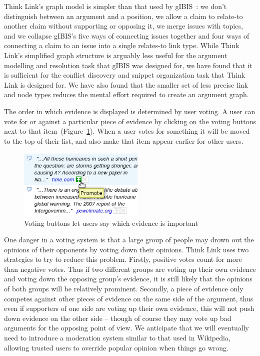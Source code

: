 \documentclass{chi2009}
\newcommand{\todo}[1]{}
\begin{document}
Think Link's graph model is simpler than that used by gIBIS~\cite{Conklin1987a}: we don't distinguish between an argument and a position, we allow a claim to relate-to another claim without supporting or opposing it, we merge issues with topics, and we collapse gIBIS's five ways of connecting issues together and four ways of connecting a claim to an issue into a single relates-to link type. 
While Think Link's simplified graph structure is arguably less useful for the argument modelling and resolution task that gIBIS was designed for, we have found that it is sufficient for the conflict discovery and snippet organization task that Think Link is designed for. 
We have also found that the smaller set of less precise link and node types reduces the mental effort required to create an argument graph.

The order in which evidence is displayed is determined by user voting. A user can vote for or against a particular piece of evidence by clicking on the voting buttons next to that item~(Figure~\ref{voting}). When a user votes for something it will be moved to the top of their list, and also make that item appear earlier for other users.

\begin{figure}[tb]
	\begin{center}
	\includegraphics[width=6cm]{../screenshots/v2_vote.png}
	\caption{Voting buttons let users say which evidence is important}
	\label{voting}
	\end{center}
\end{figure}


One danger in a voting system is that a large group of people may drown out the opinions of their opponents by voting down their opinions. Think Link uses two strategies to try to reduce this problem. Firstly, positive votes count for more than negative votes. Thus if two different groups are voting up their own evidence and voting down the opposing group's evidence, it is still likely that the opinions of both groups will be relatively prominent. Secondly, a piece of evidence only competes against other pieces of evidence on the same side of the argument, thus even if supporters of one side are voting up their own evidence, this will not push down evidence on the other side -- though of course they may vote up bad arguments for the opposing point of view. We anticipate that we will eventually need to introduce a moderation system similar to that used in Wikipedia, allowing trusted users to override popular opinion when things go wrong. 
\todo{Talk about whether we know if this works}
\end{document}
